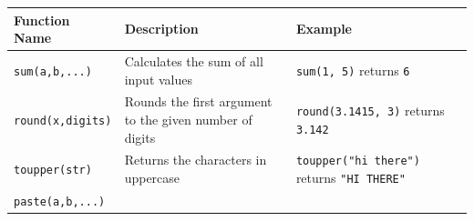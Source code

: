 \documentclass[]{book}
\theoremstyle{definition}
\theoremstyle{definition}
\theoremstyle{remark}
\begin{document}
\begin{longtable}[]{@{}lll@{}}
\toprule
\begin{minipage}[b]{0.19\columnwidth}\raggedright\strut
Function Name\strut
\end{minipage} & \begin{minipage}[b]{0.30\columnwidth}\raggedright\strut
Description\strut
\end{minipage} & \begin{minipage}[b]{0.42\columnwidth}\raggedright\strut
Example\strut
\end{minipage}\tabularnewline
\midrule
\endhead
\begin{minipage}[t]{0.19\columnwidth}\raggedright\strut
\texttt{sum(a,b,...)}\strut
\end{minipage} & \begin{minipage}[t]{0.30\columnwidth}\raggedright\strut
Calculates the sum of all input values\strut
\end{minipage} & \begin{minipage}[t]{0.42\columnwidth}\raggedright\strut
\texttt{sum(1,\ 5)} returns \texttt{6}\strut
\end{minipage}\tabularnewline
\begin{minipage}[t]{0.19\columnwidth}\raggedright\strut
\texttt{round(x,digits)}\strut
\end{minipage} & \begin{minipage}[t]{0.30\columnwidth}\raggedright\strut
Rounds the first argument to the given number of digits\strut
\end{minipage} & \begin{minipage}[t]{0.42\columnwidth}\raggedright\strut
\texttt{round(3.1415,\ 3)} returns \texttt{3.142}\strut
\end{minipage}\tabularnewline
\begin{minipage}[t]{0.19\columnwidth}\raggedright\strut
\texttt{toupper(str)}\strut
\end{minipage} & \begin{minipage}[t]{0.30\columnwidth}\raggedright\strut
Returns the characters in uppercase\strut
\end{minipage} & \begin{minipage}[t]{0.42\columnwidth}\raggedright\strut
\texttt{toupper("hi\ there")} returns \texttt{"HI\ THERE"}\strut
\end{minipage}\tabularnewline
\begin{minipage}[t]{0.19\columnwidth}\raggedright\strut
\texttt{paste(a,b,...)}\strut
\end{minipage} & \begin{minipage}[t]{0.30\columnwidth}\raggedright\strut

\end{minipage}
\end{longtable}
\end{document}
